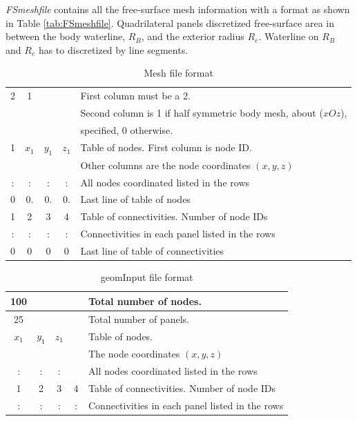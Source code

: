 \documentclass[12pt,a4paper,titlepage]{article}
\begin{document}
\emph{FSmeshfile} contains all the free-surface mesh information  with a format as shown in Table \ref{tab:FSmeshfile}. Quadrilateral panels discretized free-surface area in between the body waterline, $R_B$, and the exterior radius $R_e$. Waterline on $R_B$ and $R_e$ has to discretized by line segments.
\begin{table}[ht]
\begin{center}
\caption{Mesh file format}\label{tab:meshfile}
\begin{tabular}{ccccl}
\hline
2 & 1&\ &\ & First column must be a 2.\\
\ &\ &\ &\ & Second column is 1 if half symmetric body mesh, about ($xOz$),\\
\ &\ &\ &\ & specified, 0 otherwise.\\
\hline
1 & $x_1$& $y_1$ &$z_1$ & Table of nodes. First column is node ID.\\
\ &\ &\ &\ & Other columns are the node coordinates $(x,y,z)$\\
\hline
: & :&  :& : & All nodes coordinated listed in the rows\\
\hline
0 & 0.&  0.& 0.& Last line of table of nodes\\
\hline
1 & 2& 3 & 4 & Table of connectivities. Number of node IDs\\
\hline
: & :&  :& : & Connectivities in each panel listed in the rows\\
\hline
0 & 0&  0& 0& Last line of table of connectivities\\
\hline
\end{tabular}
\end{center}
\end{table}

\begin{table}[ht]
\begin{center}
\caption{geomInput file format}\label{tab:geomInput}
\begin{tabular}{ccccl}
\hline
100 &\ &\ &\ & Total number of nodes.\\
\hline
25 &\ &\ &\ & Total number of panels.\\
\hline
$x_1$& $y_1$ &$z_1$ &\ &Table of nodes. \\
\    &\      &\     &\ & The node coordinates $(x,y,z)$\\
\hline
 :& :&  :&\ & All nodes coordinated listed in the rows\\
\hline
1 & 2& 3 & 4 & Table of connectivities. Number of node IDs\\
\hline
: & :&  :& : & Connectivities in each panel listed in the rows\\
\hline
\end{tabular}
\end{center}
\end{table}
\end{document}
